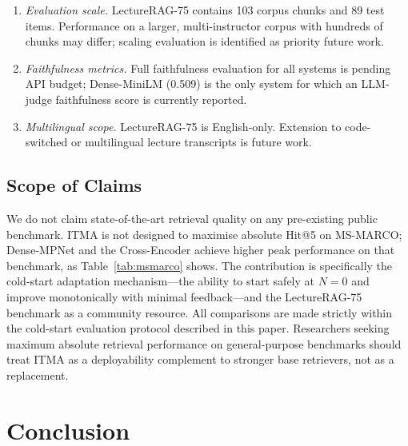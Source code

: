 \documentclass[journal]{IEEEtran}
\begin{document}
\begin{enumerate}
        static baseline produces an identical value at every $N$.
        The magnitudes of the per-metric gains ($+2.25$\,pp Hit@5,
        $+4.95$\,pp MRR, $+5.63$\,pp nDCG@10, $+2.92$\,pp Recall@10)
        are the primary effect sizes to be supported by CIs.
  \item \emph{Evaluation scale.}  LectureRAG-75 contains 103 corpus
        chunks and 89 test items.  Performance on a larger,
        multi-instructor corpus with hundreds of chunks may differ;
        scaling evaluation is identified as priority future work.
  \item \emph{Faithfulness metrics.}  Full faithfulness evaluation
        for all systems is pending API budget; Dense-MiniLM (0.509)
        is the only system for which an LLM-judge faithfulness score
        is currently reported.
  \item \emph{Multilingual scope.}  LectureRAG-75 is English-only.
        Extension to code-switched or multilingual lecture transcripts
        is future work.
\end{enumerate}

\subsection{Scope of Claims}
We do not claim state-of-the-art retrieval quality on any pre-existing
public benchmark.  ITMA is not designed to maximise absolute Hit@5 on
MS-MARCO; Dense-MPNet and the Cross-Encoder achieve higher peak
performance on that benchmark, as Table~\ref{tab:msmarco} shows.  The
contribution is specifically the cold-start adaptation mechanism---the
ability to start safely at $N{=}0$ and improve monotonically with
minimal feedback---and the LectureRAG-75 benchmark as a community
resource.  All comparisons are made strictly within the cold-start
evaluation protocol described in this paper.  Researchers seeking
maximum absolute retrieval performance on general-purpose benchmarks
should treat ITMA as a deployability complement to stronger base
retrievers, not as a replacement.

\section{Conclusion}
\label{sec:conclusion}
\end{document}

